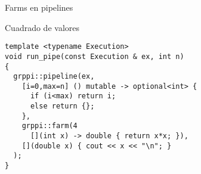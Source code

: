\begin{frame}[t,fragile]{Farms en pipelines}
\begin{block}{Cuadrado de valores}
\begin{lstlisting}
template <typename Execution>
void run_pipe(const Execution & ex, int n)
{
  grppi::pipeline(ex,
    [i=0,max=n] () mutable -> optional<int> {
      if (i<max) return i;
      else return {};
    },
    grppi::farm(4
      [](int x) -> double { return x*x; }),
    [](double x) { cout << x << "\n"; }
  );
}
\end{lstlisting}
\end{block}
\end{frame}

